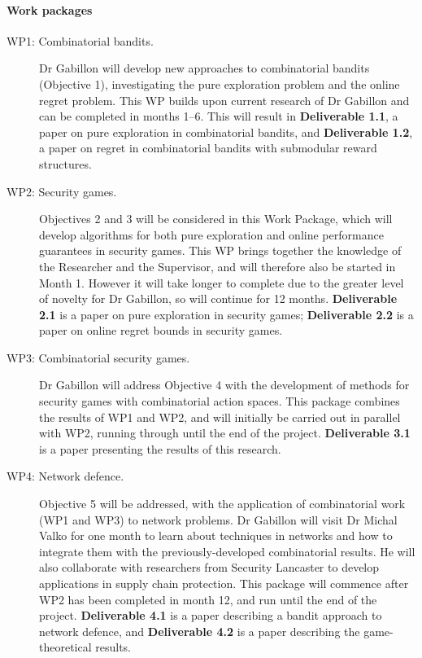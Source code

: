 \documentclass[a4paper,11pt]{article}
\begin{document}
\paragraph{Work packages}
\begin{description}
\item[WP1: Combinatorial bandits.] Dr Gabillon will develop new approaches to combinatorial bandits (Objective 1), investigating the pure exploration problem and the online regret problem.  This WP builds upon current research of Dr Gabillon and can be completed in months 1--6.  This will result in {\bf Deliverable 1.1}, a paper on pure exploration in combinatorial bandits, and {\bf Deliverable 1.2}, a paper on regret in combinatorial bandits with submodular reward structures.
\item[WP2: Security games.] Objectives 2 and 3 will be considered in this Work Package, which will develop algorithms for both pure exploration and online performance guarantees in security games.  This WP brings together the knowledge of the Researcher and the Supervisor, and will therefore also be started in Month 1.  However it will take longer to complete due to the greater level of novelty for Dr Gabillon, so will continue for 12 months.  {\bf Deliverable 2.1} is a paper on pure exploration in security games; {\bf Deliverable 2.2} is a paper on online regret bounds in security games.
\item[WP3: Combinatorial security games.] Dr Gabillon will address Objective 4 with the development  of methods for security games with combinatorial action spaces. This package combines the results of WP1 and WP2, and will initially be carried out in parallel with WP2, running through until the end of the project.
{\bf Deliverable 3.1} is a paper presenting the results of this research.
\item[WP4: Network defence.] Objective 5 will be addressed, with the application of combinatorial work (WP1 and WP3) to network problems. Dr Gabillon will visit Dr Michal Valko for one month to learn about techniques in networks and how to integrate them with the previously-developed combinatorial results.  He will also collaborate with researchers from Security Lancaster to develop applications in supply chain protection.  This package will commence after WP2 has been completed in month 12, and run until the end of the project. {\bf Deliverable 4.1} is a paper describing a bandit approach to network defence, and {\bf Deliverable 4.2} is a paper describing the game-theoretical results.
\end{description}
\end{document}
